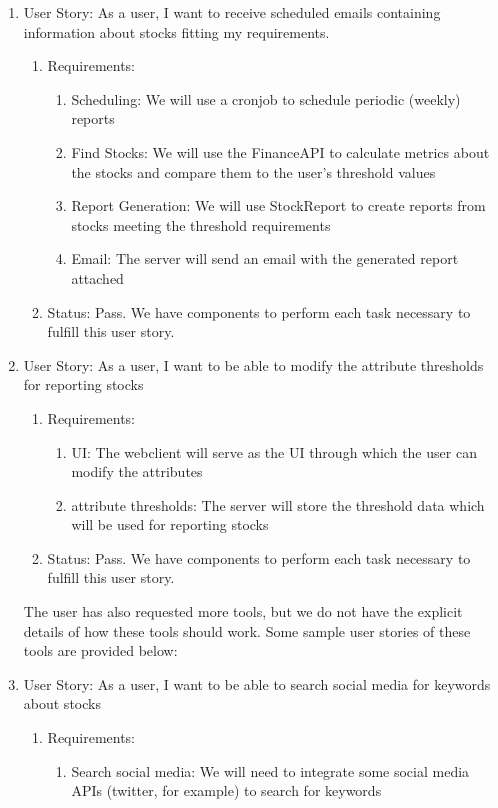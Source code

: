 \documentclass[12pt,a4paper]{article}
\begin{document}
\begin{enumerate}
\item User Story: As a user, I want to receive scheduled emails containing information about stocks fitting my requirements. 
\begin{enumerate}
\item Requirements:
\begin{enumerate}
\item Scheduling: We will use a cronjob to schedule periodic (weekly) reports
\item Find Stocks: We will use the FinanceAPI to calculate metrics about the stocks and compare them to the user's threshold values 
\item Report Generation: We will use StockReport to create reports from stocks meeting the threshold requirements
\item Email: The server will send an email with the generated report attached
\end{enumerate}
\item Status: Pass.  We have components to perform each task necessary to fulfill this user story.
\end{enumerate}
\item User Story: As a user, I want to be able to modify the attribute thresholds for reporting stocks 
\begin{enumerate}
\item Requirements:
\begin{enumerate}
\item UI: The webclient will serve as the UI through which the user can modify the attributes
\item attribute thresholds: The server will store the threshold data which will be used for reporting stocks
\end{enumerate}
\item Status: Pass. We have components to perform each task necessary to fulfill this user story.
\end{enumerate}
The user has also requested more tools, but we do not have the explicit details of how these tools should work. Some sample user stories of these tools are provided below:
\item User Story: As a user, I want to be able to search social media for keywords about stocks
\begin{enumerate}
\item Requirements:
\begin{enumerate}
\item Search social media: We will need to integrate some social media APIs  (twitter, for example) to search for keywords

\end{enumerate}
\end{enumerate}
\end{enumerate}
\end{document}

